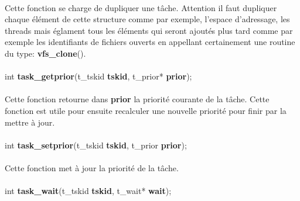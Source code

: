 \documentclass[10pt,a4wide]{article}
\begin{document}
\paragraph{}

Cette fonction se charge de dupliquer une t\^ache. Attention il faut dupliquer
chaque \'el\'ement de cette structure comme par exemple, l'espace d'adressage,
les threads mais \'eglament tous les \'el\'ements qui seront ajout\'es plus
tard comme par exemple les identifiants de fichiers ouverts en appellant
certainement une routine du type: \textbf{vfs\_clone}().

\paragraph{}

\hspace{1.5cm}int \textbf{task\_getprior}(t\_tskid \textbf{tskid},
                                          t\_prior* \textbf{prior});

\paragraph{}

Cette fonction retourne dans \textbf{prior} la priorit\'e courante
de la t\^ache. Cette fonction est utile pour ensuite recalculer une
nouvelle priorit\'e pour finir par la mettre \`a jour.

\paragraph{}

\hspace{1.5cm}int \textbf{task\_setprior}(t\_tskid \textbf{tskid},
                                          t\_prior \textbf{prior});

\paragraph{}

Cette fonction met \`a jour la priorit\'e de la t\^ache.

\paragraph{}

\hspace{1.5cm}int \textbf{task\_wait}(t\_tskid \textbf{tskid},
                                      t\_wait* \textbf{wait});
\end{document}
